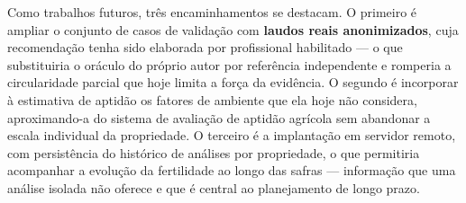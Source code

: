 Como trabalhos futuros, três encaminhamentos se destacam. O primeiro é ampliar o
conjunto de casos de validação com \textbf{laudos reais anonimizados}, cuja recomendação
tenha sido elaborada por profissional habilitado --- o que substituiria o oráculo do
próprio autor por referência independente e romperia a circularidade parcial que hoje
limita a força da evidência. O segundo é incorporar à estimativa de aptidão os fatores
de ambiente que ela hoje não considera, aproximando-a do sistema de avaliação de aptidão
agrícola sem abandonar a escala individual da propriedade. O terceiro é a implantação em
servidor remoto, com persistência do histórico de análises por propriedade, o que
permitiria acompanhar a evolução da fertilidade ao longo das safras --- informação que
uma análise isolada não oferece e que é central ao planejamento de longo prazo.
